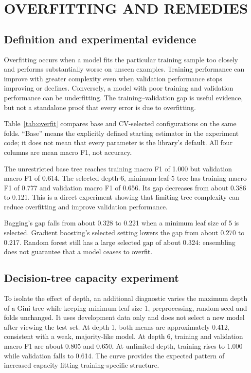 
\clearpage
\chapter{OVERFITTING AND REMEDIES}
\section{Definition and experimental evidence}
Overfitting occurs when a model fits the particular training sample too closely and performs substantially worse on unseen examples. Training performance can improve with greater complexity even when validation performance stops improving or declines. Conversely, a model with poor training and validation performance can be underfitting. The training--validation gap is useful evidence, but not a standalone proof that every error is due to overfitting.

Table~\ref{tab:overfit} compares base and CV-selected configurations on the same folds. ``Base'' means the explicitly defined starting estimator in the experiment code; it does not mean that every parameter is the library's default. All four columns are mean macro F1, not accuracy.

The unrestricted base tree reaches training macro F1 of 1.000 but validation macro F1 of 0.614. The selected depth-6, minimum-leaf-5 tree has training macro F1 of 0.777 and validation macro F1 of 0.656. Its gap decreases from about 0.386 to 0.121. This is a direct experiment showing that limiting tree complexity can reduce overfitting and improve validation performance.

Bagging's gap falls from about 0.328 to 0.221 when a minimum leaf size of 5 is selected. Gradient boosting's selected setting lowers the gap from about 0.270 to 0.217. Random forest still has a large selected gap of about 0.324: ensembling does not guarantee that a model ceases to overfit.

\section{Decision-tree capacity experiment}
To isolate the effect of depth, an additional diagnostic varies the maximum depth of a Gini tree while keeping minimum leaf size 1, preprocessing, random seed and folds unchanged. It uses development data only and does not select a new model after viewing the test set.
At depth 1, both means are approximately 0.412, consistent with a weak, majority-like model. At depth 6, training and validation macro F1 are about 0.805 and 0.650. At unlimited depth, training rises to 1.000 while validation falls to 0.614. The curve provides the expected pattern of increased capacity fitting training-specific structure.

